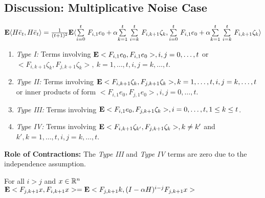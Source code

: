 \subsection{Discussion: Multiplicative Noise Case}
$\E\ip{H\eb_t,H\eb_t}=\frac{1}{(t+1)^2}\E \ip{\ous{\sum}{i=0}{t} F_{i,1}e_0+\alpha \ous{\sum}{k=1}{t} \ous{\sum}{i=k}{t} F_{i,k+1} \zeta_k,\ous{\sum}{i=0}{t} F_{i,1}e_0+\alpha \ous{\sum}{k=1}{t} \ous{\sum}{i=k}{t} F_{i,k+1} \zeta_k}$
\begin{enumerate}
\item \emph{Type I:} Terms involving $\E<F_{i,1}e_0,F_{i,1}e_0>, i,j=0,\ldots, t$ or $<F_{i,k+1}\zeta_k, F_{j,k+1}\zeta_k>,~ k=1,\ldots,t, i,j=k,\ldots,t$.
\item \emph{Type II:} Terms involving $\E<F_{i,k+1}\zeta_k, F_{j,k+1}\zeta_k>, k=1,\ldots,t, i,j=k,\ldots,t$ or inner products of form $<F_{i,1}e_0, F_{j,1}e_0>, i,j=0,\ldots, t$.
\item \emph{Type III:} Terms involving $\E<F_{i,1}e_0, F_{j,k+1}\zeta_k>, i=0,\ldots,t, 1\leq k \leq t$.
\item \emph{Type IV:} Terms involving $\E<F_{i,k+1}\zeta_{k'}, F_{j,k+1}\zeta_k>, k\neq k'$ and $k',k=1,\ldots,t, i,j=k,\ldots,t$.
\end{enumerate}
\textbf{Role of Contractions:}
The \emph{Type III} and \emph{Type IV} terms are zero due to the independence assumption.
\begin{lemma}
For all $i>j$ and $x\in \R^n$ $\E <F_{j,k+1} x,F_{i,k+1}x>=\E<F_{j,k+1}k,(I-\alpha H)^{i-j} F_{j,k+1}x>$
\end{lemma}
